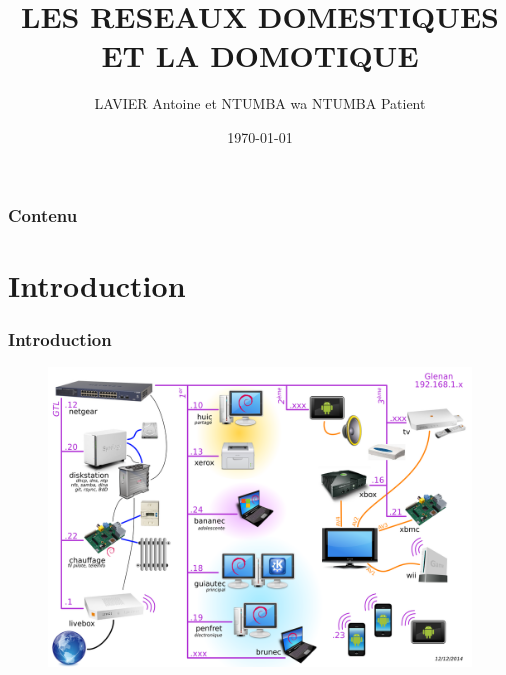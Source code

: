\documentclass[handout]{beamer}
\begin{document}
\title{LES RESEAUX DOMESTIQUES ET LA DOMOTIQUE}  
\author{LAVIER Antoine et NTUMBA wa NTUMBA Patient}
\date{\today} 

\begin{frame}
\titlepage
\end{frame} 

\begin{frame}
\frametitle{Contenu}
\tableofcontents
\end{frame} 


\section{Introduction} 
\begin{frame}\frametitle{Introduction} 
\begin{figure}
		\centering
		\includegraphics[width=1\textwidth,natwidth=100,natheight=100]{image/LAN6.png}
\end{figure}
\end{frame}
\end{document}
